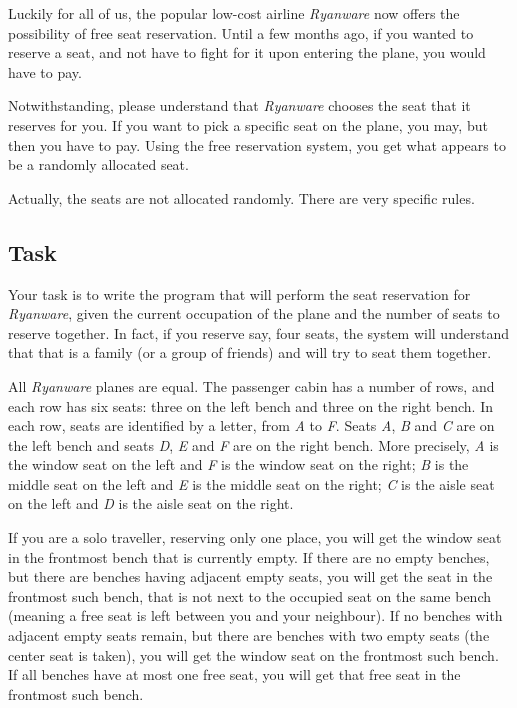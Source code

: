 \documentclass[11pt]{report}
\begin{document}
Luckily for all of us, the popular low-cost airline \textit{Ryanware} now offers the possibility of free seat reservation. Until a few  months ago, if you wanted to reserve a seat, and not have to fight for it upon entering the plane, you would have to pay.

Notwithstanding, please understand that \textit{Ryanware} chooses the seat that it reserves for you. If you want to pick a specific seat on the plane, you may, but then you have to pay. Using the free reservation system, you get what appears to be a randomly allocated seat.

Actually, the seats are not allocated randomly. There are very specific rules.

\subsection*{Task}

Your task is to write the program that will perform the seat reservation for \textit{Ryanware}, given the current occupation of the plane and the number of seats to reserve together. In fact, if you reserve say, four seats, the system will understand that that is a family (or a group of friends) and will try to seat them together.

All \textit{Ryanware} planes are equal. The passenger cabin has a number of
rows, and each row has six seats: three on the left bench and three on the right
bench. In each row, seats are identified by a letter, from \textit{A} to
\textit{F}. Seats \textit{A}, \textit{B} and \textit{C} are on the left bench
and seats \textit{D}, \textit{E} and \textit{F} are on the right bench. More
precisely, \textit{A} is the window seat on the left and \textit{F} is the
window seat on the right; \textit{B} is the middle seat on the left and
\textit{E} is the middle seat on the right; \textit{C} is the aisle seat on the
left and \textit{D} is the aisle seat on the right.

If you are a solo traveller, reserving only one place, you will get the window
seat in the frontmost bench that is currently empty. If there are no empty
benches, but there are benches having adjacent empty seats, you will get the
seat in the frontmost such bench, that is not next to the occupied seat on the
same bench (meaning a free seat is left between you and your neighbour). If no
benches with adjacent empty seats remain, but there are benches with two empty
seats (the center seat is taken), you will get the window seat on the frontmost
such bench. If all benches have at most one free seat, you will get that free
seat in the frontmost such bench.
\end{document}
